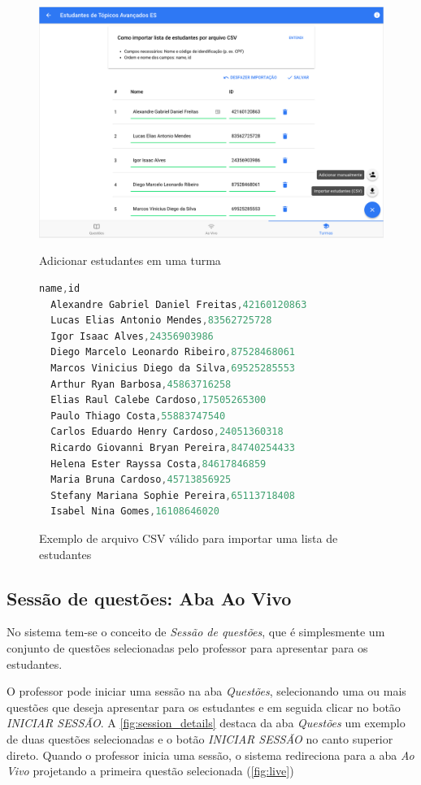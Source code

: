 \begin{figure}[h]
  \centering
  \caption{Adicionar estudantes em uma turma}
  \includegraphics[scale=.4]{imagens/telas/add_students}
  \doautor
  \label{fig:add_students}
\end{figure}

\begin{figure}[h]
\caption{Exemplo de arquivo CSV válido para importar uma lista de estudantes}
\begin{lstlisting}[language=JavaScript]
  name,id
  Alexandre Gabriel Daniel Freitas,42160120863
  Lucas Elias Antonio Mendes,83562725728
  Igor Isaac Alves,24356903986
  Diego Marcelo Leonardo Ribeiro,87528468061
  Marcos Vinicius Diego da Silva,69525285553
  Arthur Ryan Barbosa,45863716258
  Elias Raul Calebe Cardoso,17505265300
  Paulo Thiago Costa,55883747540
  Carlos Eduardo Henry Cardoso,24051360318
  Ricardo Giovanni Bryan Pereira,84740254433
  Helena Ester Rayssa Costa,84617846859
  Maria Bruna Cardoso,45713856925
  Stefany Mariana Sophie Pereira,65113718408
  Isabel Nina Gomes,16108646020
\end{lstlisting}
  \doautor
\label{fig:import_csv}
\end{figure}

\subsection{Sessão de questões: Aba Ao Vivo}

No sistema tem-se o conceito de \textit{Sessão de questões}, que é
simplesmente um conjunto de questões selecionadas pelo professor
para apresentar para os estudantes.

O professor pode iniciar uma sessão na aba \textit{Questões}, selecionando
uma ou mais questões que deseja apresentar para os estudantes e
em seguida clicar no botão \textit{INICIAR SESSÃO}. A \autoref{fig:session_details}
destaca da aba \textit{Questões} um exemplo de duas questões selecionadas e o botão
\textit{INICIAR SESSÃO} no canto superior direto. Quando o professor inicia uma sessão,
o sistema redireciona para a aba \textit{Ao Vivo} projetando a primeira questão selecionada (\autoref{fig:live})

